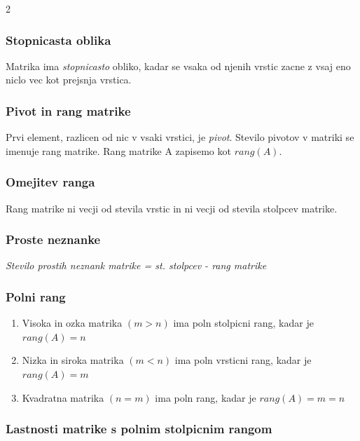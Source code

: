 \documentclass{article}
\begin{document}
\begin{multicols}{2}
	\subsubsection{Stopnicasta oblika}

	Matrika ima \textit{stopnicasto} obliko, kadar se vsaka od njenih vrstic zacne z vsaj eno
	niclo vec kot prejsnja vrstica.

	\subsubsection{Pivot in rang matrike}

	Prvi element, razlicen od nic v vsaki vrstici, je \textit{pivot}. Stevilo pivotov v matriki
	se imenuje rang matrike. Rang matrike A zapisemo kot $rang(A)$.

	\subsubsection{Omejitev ranga}

	Rang matrike ni vecji od stevila vrstic in ni vecji od stevila stolpcev matrike.

	\subsubsection{Proste neznanke}

	\begin{center}
		\textit{Stevilo prostih neznank matrike = st. stolpcev - rang matrike}
	\end{center}

	\subsubsection{Polni rang}

	\begin{enumerate}
		\item Visoka in ozka matrika $(m > n)$ ima poln stolpicni rang, kadar je $rang(A) = n$
		\item Nizka in siroka matrika $(m < n)$ ima poln vrsticni rang, kadar je $rang(A) = m$
		\item Kvadratna matrika $(n = m)$ ima poln rang, kadar je $rang(A) = m = n$
	\end{enumerate}

	\subsubsection{Lastnosti matrike s polnim stolpicnim rangom}


\end{multicols}
\end{document}
